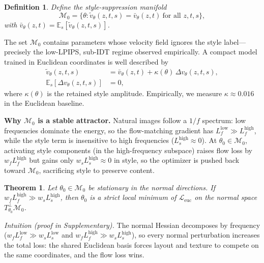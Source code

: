 \documentclass[letterpaper]{article}
\newtheorem{definition}{Definition}
\newtheorem{theorem}{Theorem}
\begin{document}
\begin{definition}
\label{def:attractor}
Define the style-suppression manifold
\begin{equation}
\mathcal M_0 = \{\theta:\tilde v_\theta(z,t,s)=\bar v_\theta(z,t)\ \text{for all } z,t,s\},
\end{equation}
with $\bar v_\theta(z,t)=\mathbb E_s[\tilde v_\theta(z,t,s)]$.
\end{definition}

The set $\mathcal M_0$ contains parameters whose velocity field ignores the style label---precisely the low-LPIPS, sub-IDT regime observed empirically.
A compact model trained in Euclidean coordinates is well described by
\begin{equation}
\begin{aligned}
\tilde v_\theta(z,t,s) &= \bar v_\theta(z,t) + \kappa(\theta)\,\Delta v_\theta(z,t,s),\\
\mathbb E_s[\Delta v_\theta(z,t,s)] &= 0,
\end{aligned}
\label{eq:kappa}
\end{equation}
where $\kappa(\theta)$ is the retained style amplitude.
Empirically, we measure $\kappa\approx0.016$ in the Euclidean baseline.

\textbf{Why $\mathcal M_0$ is a stable attractor.}
Natural images follow a $1/f$ spectrum: low frequencies dominate the energy, so the flow-matching gradient has $L_f^{\mathrm{low}}\gg L_f^{\mathrm{high}}$, while the style term is insensitive to high frequencies ($L_s^{\mathrm{high}}\approx0$).
At $\theta_0\in\mathcal M_0$, activating style components (in the high-frequency subspace) raises flow loss by $w_f L_f^{\mathrm{high}}$ but gains only $w_s L_s^{\mathrm{high}}\approx0$ in style, so the optimizer is pushed back toward $\mathcal M_0$, sacrificing style to preserve content.

\begin{theorem}
\label{thm:attractor}
Let $\theta_0\in\mathcal M_0$ be stationary in the normal directions.
If $w_f L_f^{\mathrm{high}} \gg w_s L_s^{\mathrm{high}}$, then $\theta_0$ is a strict local minimum of $\mathcal L_{\mathrm{euc}}$ on the normal space $T_{\theta_0}^{\perp}\mathcal M_0$.
\end{theorem}

\textit{Intuition (proof in Supplementary).}
The normal Hessian decomposes by frequency ($w_f L_f^{\mathrm{low}} \gg w_s L_s^{\mathrm{low}}$ and $w_f L_f^{\mathrm{high}} \gg w_s L_s^{\mathrm{high}}$), so every normal perturbation increases the total loss: the shared Euclidean basis forces layout and texture to compete on the same coordinates, and the flow loss wins.
\end{document}
